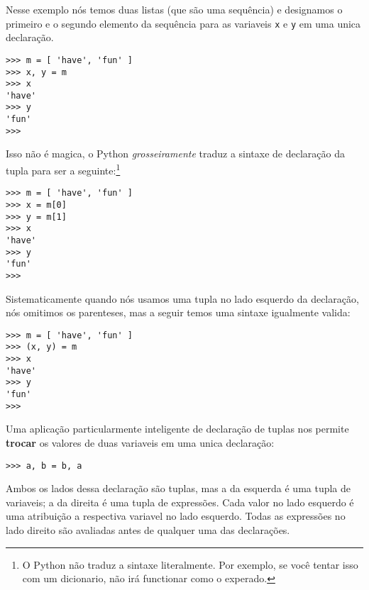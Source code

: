 Nesse exemplo nós temos duas listas (que são uma sequência) e
designamos o primeiro e o segundo elemento da sequência para as
variaveis {\tt x} e {\tt y} em uma unica declaração.

\beforeverb
\begin{verbatim}
>>> m = [ 'have', 'fun' ]
>>> x, y = m
>>> x
'have'
>>> y
'fun'
>>> 
\end{verbatim}
\afterverb
%
Isso não é magica, o Python \emph{grosseiramente} traduz a
sintaxe de declaração da tupla
para ser a seguinte:\footnote{O Python não traduz a sintaxe
literalmente. Por exemplo, se você tentar isso com um dicionario, não
irá functionar como o experado.}

\beforeverb
\begin{verbatim}
>>> m = [ 'have', 'fun' ]
>>> x = m[0]
>>> y = m[1]
>>> x
'have'
>>> y
'fun'
>>> 
\end{verbatim}
\afterverb

Sistematicamente quando nós usamos uma tupla no lado esquerdo da
declaração, nós omitimos os parenteses, mas a seguir temos uma sintaxe
igualmente valida:

\beforeverb
\begin{verbatim}
>>> m = [ 'have', 'fun' ]
>>> (x, y) = m
>>> x
'have'
>>> y
'fun'
>>> 
\end{verbatim}
\afterverb
%
Uma aplicação particularmente inteligente de declaração de tuplas 
nos permite {\bf trocar} os valores de duas variaveis em uma unica declaração:

\beforeverb
\begin{verbatim}
>>> a, b = b, a
\end{verbatim}
\afterverb
%
Ambos os lados dessa declaração são tuplas, mas
a da esquerda é uma tupla de variaveis; a da direita é uma tupla de
expressões. Cada valor no lado esquerdo
é uma atribuição a respectiva variavel no lado esquerdo.
Todas as expressões no lado direito são avaliadas antes de qualquer
uma das declarações.

